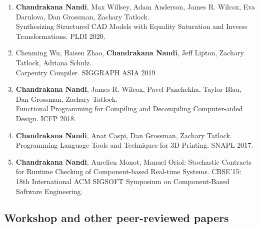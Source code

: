 \documentclass[margin, 10pt]{res} %
\begin{document}
\begin{resume}
\begin{enumerate}
  \item \textbf{Chandrakana Nandi}, Max Willsey, Adam Anderson, James R. Wilcox, Eva Darulova, Dan Grossman, Zachary Tatlock. \\
    Synthesizing Structured CAD Models with Equality Saturation and Inverse Transformations. PLDI 2020.
  \item Chenming Wu, Haisen Zhao, \textbf{Chandrakana Nandi}, Jeff Lipton, Zachary Tatlock, Adriana Schulz. \\
    Carpentry Compiler. SIGGRAPH ASIA 2019

  \item \textbf{Chandrakana Nandi}, James R. Wilcox, Pavel Panchekha, Taylor Blau, Dan Grossman, Zachary Tatlock. \\
    Functional Programming for Compiling and Decompiling Computer-aided Design. ICFP 2018.
  \item \textbf{Chandrakana Nandi}, Anat Caspi, Dan Grossman, Zachary Tatlock. \\
    Programming Language Tools and Techniques for 3D Printing. SNAPL 2017.

\item \textbf{Chandrakana Nandi}, Aurelien Monot, Manuel Oriol: Stochastic Contracts for Runtime Checking of Component-based Real-time Systems. CBSE'15: 18th International ACM SIGSOFT Symposium on Component-Based Software Engineering.
\end{enumerate}


\subsection{Workshop and other peer-reviewed papers}


\end{resume}
\end{document}
